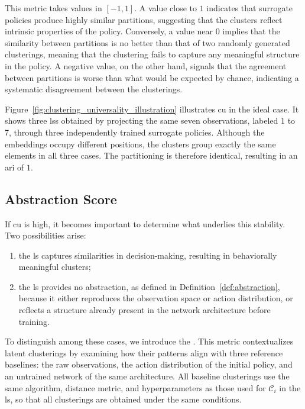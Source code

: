 This metric takes values in $[-1, 1]$.
A value close to $1$ indicates that surrogate policies produce highly similar partitions, suggesting that the clusters reflect intrinsic properties of the policy.
Conversely, a value near $0$ implies that the similarity between partitions is no better than that of two randomly generated clusterings, meaning that the clustering fails to capture any meaningful structure in the policy.
A negative value, on the other hand, signals that the agreement between partitions is worse than what would be expected by chance, indicating a systematic disagreement between the clusterings.

Figure~\ref{fig:clustering_universality_illustration} illustrates \gls{cu} in the ideal case.
It shows three \glspl{ls} obtained by projecting the same seven observations, labeled 1 to 7, through three independently trained surrogate policies.
Although the embeddings occupy different positions, the clusters group exactly the same elements in all three cases.
The partitioning is therefore identical, resulting in an \gls{ari} of $1$.



\subsection{Abstraction Score}
\label{subsec:abstraction_score}

If \gls{cu} is high, it becomes important to determine what underlies this stability.
Two possibilities arise:
\begin{enumerate}[label=(\roman*), ref=(\roman*)]
\item \label{case:abstraction} the \gls{ls} captures similarities in decision-making, resulting in behaviorally meaningful clusters;
\item \label{case:no_abstraction} the \gls{ls} provides no abstraction, as defined in Definition~\ref{def:abstraction}, because it either reproduces the observation space or action distribution, or reflects a structure already present in the network architecture before training.
\end{enumerate}

To distinguish among these cases, we introduce the .
This metric contextualizes latent clusterings by examining how their patterns align with three reference baselines: the raw observations, the action distribution of the initial policy, and an untrained network of the same architecture.
All baseline clusterings use the same algorithm, distance metric, and hyperparameters as those used for $\mathcal{C}_{i}$ in the \gls{ls}, so that all clusterings are obtained under the same conditions.

